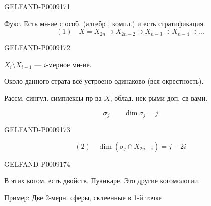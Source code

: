 \begin{GelfandAdjacentEvidence}{GELFAND-P000917}{1}

\qquad {}

\uline{Фукс.} Есть мн-ие с особ. (алгебр., компл.) и есть стратификация.
\begin{equation*}
 (1)\quad X=X_{2n}\supset X_{2n-2}\supset X_{n-3}\supset X_{n-4}\supset\ldots
\end{equation*}
\end{GelfandAdjacentEvidence}
\begin{GelfandAdjacentEvidence}{GELFAND-P000917}{2}


$X_i\setminus X_{i-1}$ --- $i$-мерное мн-ие.

Около данного страта всё устроено одинаково (вся окрестность).

Рассм. сингул. симплексы пр-ва $X$, облад. нек-рыми доп. св-вами.

\begin{equation*}
 \sigma_j\qquad \dim\sigma_j=j
\end{equation*}
\end{GelfandAdjacentEvidence}
\begin{GelfandAdjacentEvidence}{GELFAND-P000917}{3}


\begin{equation*}
 (2)\quad \dim(\sigma_j\cap X_{2n-i})=j-2i
\end{equation*}
\end{GelfandAdjacentEvidence}
\begin{GelfandAdjacentEvidence}{GELFAND-P000917}{4}


В этих когом. есть двойств. Пуанкаре. Это другие когомологии.

\uline{Пример:} Две 2-мерн. сферы, склеенные в 1-й точке
\end{GelfandAdjacentEvidence}

